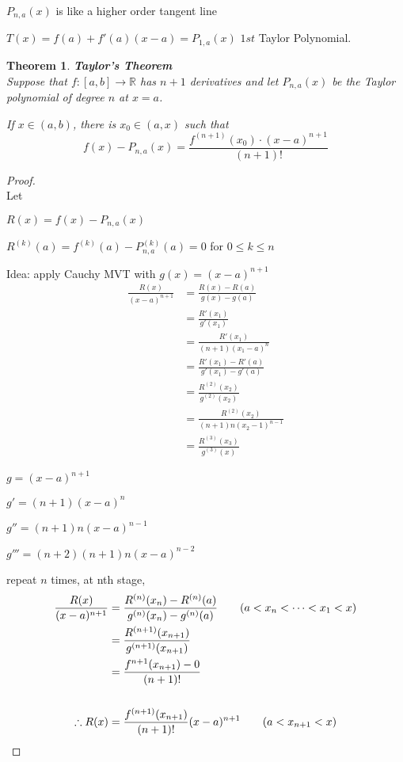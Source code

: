 \documentclass[12pt]{article}
\theoremstyle{plain}
\newtheorem{theorem}{Theorem}[subsection]
\begin{document}
	$P_{n,a}(x)$ is like a higher order tangent line

	$T(x) = f(a) + f'(a)(x-a)=P_{1,a}(x)$ $1st$ Taylor Polynomial.\\


	\begin{theorem}{\textbf{Taylor's Theorem}}\\
		Suppose that $f:[a,b] \to \mathbb{R}$ has $n+1$ derivatives and 
		let $P_{n,a}(x)$ be the Taylor polynomial of degree $n$ at $x=a$.

		If $x\in(a,b)$, there is $x_0 \in (a,x)$ such that 
		\[
			f(x)-P_{n,a}(x) = \frac{f^{(n+1)}(x_0)\cdot (x-a)^{n+1}}{(n+1)!}
		\]
	\end{theorem}
	\begin{proof}
		$ $\\
		Let 
		\begin{description}
			\item $R(x) = f(x) - P_{n,a}(x)$
			\item $R^{(k)}(a) = f^{(k)}(a) - P^{(k)}_{n,a}(a) = 0$ 
					for $0\leq k\leq n$
		\end{description}

	Idea: apply Cauchy MVT with $g(x) = (x-a)^{n+1}$
	\begin{align*}
		\frac{R(x)}{(x-a)^{n+1}} 
		&=\frac{R(x)-R(a)}{g(x)-g(a)} \\
		&=\frac{R'(x_1)}{g'(x_1)} \tag{$a<x_1<x$}\\
		&=\frac{R'(x_1)}{(n+1)(x_1-a)^n}\\
		&=\frac{R'(x_1)-R'(a)}{g'(x_1)-g'(a)}\\
		&=\frac{R^{(2)}(x_2)}{g^{(2)}(x_2)} \tag{$a<x_2<x_1<x$}\\
		&=\frac{R^{(2)}(x_2)}{(n+1)n(x_2-1)^{n-1}}\\
		&=\frac{R^{(3)}(x_3)}{g^{(3)}(x)} \tag{$a<x_3<x_2<x_1<x$}
	\end{align*}
	\begin{description}
		\item $g=(x-a)^{n+1}$
		\item $g'=(n+1)(x-a)^n$
		\item $g''= (n+1)n(x-a)^{n-1}$
		\item $g'''=(n+2)(n+1)n(x-a)^{n-2}$
	\end{description}

	repeat $n$ times, at nth stage, 
	\begin{align*}
		\frac{R(x)}{(x-a)^{n+1}}
		&=\frac{R^{(n)}(x_n)-R^{(n)}(a)}
		{g^{(n)}(x_n)-g^{(n)}(a)} \tag{$a<x_n<\cdots<x_1<x$}\\
		&=\frac{R^{(n+1)}(x_{n+1})}{g^{(n+1)}(x_{n+1})}\\
		&=\frac{f^{n+1}(x_{n+1})-0}{(n+1)!}\\\\
		\therefore R(x) &= \frac{f^{(n+1)}(x_{n+1})}{(n+1)!}(x-a)^{n+1} 
		\tag{$a<x_{n+1}<x$}
	\end{align*}
\end{proof}
\end{document}
